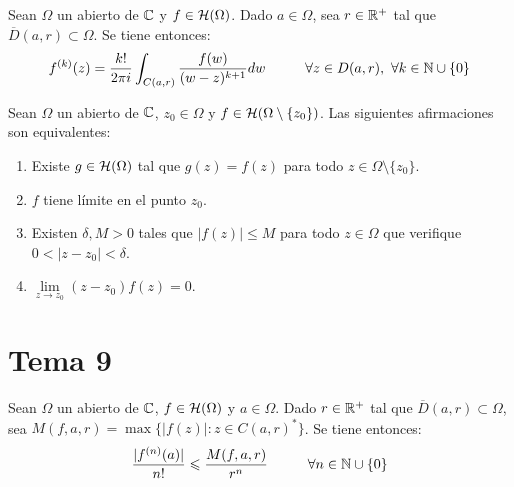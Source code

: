 \documentclass[12pt]{article}
\begin{document}
    \begin{prop} Sean $\Omega$ un abierto de $\mathbb{C}$ y $f\in \mathcal{H}(\Omega)$. Dado $a\in \Omega$, sea $r\in \mathbb{R}^+$ tal que $\overline{D}(a,r)\subset \Omega$. Se tiene entonces:
        \begin{gather*}
            f^{(k)} (z) = \frac{k!}{2\pi i } \int_{C(a,r)} \frac{f(w)}{(w-z)^{k+1}} dw \hspace{1cm} \forall z \in D(a,r),\ \forall k \in \mathbb{N}\cup \{0\}
        \end{gather*}
    \end{prop}

    \begin{teo}
        Sean $\Omega$ un abierto de $\mathbb{C}$, $z_0 \in \Omega$ y $f\in \mathcal{H}(\Omega\setminus \{z_0\})$. Las siguientes afirmaciones son equivalentes:
        \begin{enumerate}
            \item Existe $g\in \mathcal{H}(\Omega)$ tal que $g(z) = f(z)$ para todo $z\in \Omega \setminus \{z_0\}$.
            \item $f$ tiene límite en el punto $z_0$.
            \item Existen $\delta,M>0$ tales que $|f(z)|\leq M$ para todo $z \in \Omega$ que verifique $0 < |z - z_0| < \delta$.
            \item $\lim\limits_{z \to z_0} (z - z_0) f(z) = 0$.
        \end{enumerate}
    \end{teo}

    \newpage

    \section{Tema 9}

    \begin{prop} Sean $\Omega$ un abierto de $\mathbb{C}$, $f\in \mathcal{H}(\Omega)$ y $a\in \Omega$. Dado $r\in \mathbb{R}^+$ tal que $\overline{D}(a,r)\subset \Omega$, sea $M(f,a,r) = \max \{|f(z)|: z\in C(a,r)^*\}$. Se tiene entonces:
    \begin{gather*}
        \frac{|f^{(n)}(a)|}{n!} \leqslant \frac{M(f,a,r)}{r^n} \hspace{1cm} \forall n \in \mathbb{N}\cup \{0\}
    \end{gather*}       
    \end{prop}
\end{document}
